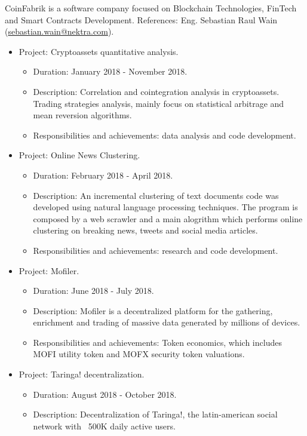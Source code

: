 \documentclass[11pt,a4paper,sans]{moderncv}        %
\begin{document}
{CoinFabrik is a software company focused on Blockchain Technologies, FinTech and Smart Contracts Development.
References: Eng. Sebastian Raul Wain (\href{mailto:sebastian.wain@nektra.com}{sebastian.wain@nektra.com}).
\begin{itemize}%
\item Project: Cryptoassets quantitative analysis.
	\begin{itemize}%
	\item Duration: January 2018 - November 2018.
	\item Description: Correlation and cointegration analysis in cryptoassets. 
	Trading strategies analysis, mainly focus on statistical arbitrage and mean reversion algorithms.
	\item Responsibilities and achievements: data analysis and code development.
	\end{itemize}
\item Project: Online News Clustering.
	\begin{itemize}%
	\item Duration: February 2018 - April 2018.
	\item Description: An incremental clustering of text documents code was developed using natural language processing techniques.
	The program is composed by a web scrawler and a main alogrithm which performs online clustering on breaking news,
	tweets and social media articles.
	\item Responsibilities and achievements: research and code development.
	\end{itemize}
\item Project: Mofiler.
	\begin{itemize}%
	\item Duration: June 2018 - July 2018.
	\item Description: Mofiler is a decentralized platform for the gathering, enrichment and trading of
	massive data generated by millions of devices.
	\item Responsibilities and achievements: Token economics, which includes MOFI utility token and MOFX security token valuations.
	\end{itemize}
\item Project: Taringa! decentralization.
	\begin{itemize}%
	\item Duration: August 2018 - October 2018.
	\item Description: Decentralization of Taringa!, the latin-american social network with ~500K daily active users.

\end{itemize}
\end{itemize}}
\end{document}
